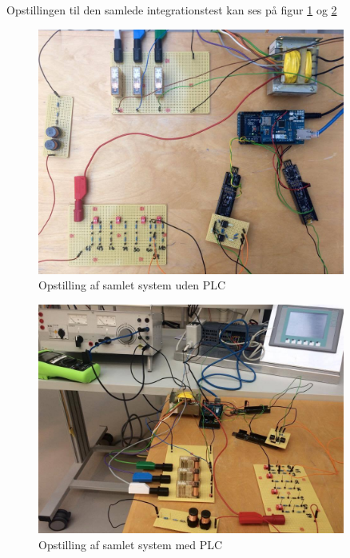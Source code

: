 Opstillingen til den samlede integrationstest kan ses på figur \ref{fig:Opstilling1} og \ref{fig:Opstilling2}

\begin{figure}[H] 
	\centering
	\includegraphics[width=0.9\textwidth]{Figure/Opstillingudenplc}
	\caption{Opstilling af samlet system uden PLC}
	\label{fig:Opstilling1}
\end{figure}

\begin{figure}[H] 
	\centering
	\includegraphics[width=0.9\textwidth]{Figure/Opstillingmedplc}
	\caption{Opstilling af samlet system med PLC}
	\label{fig:Opstilling2}
\end{figure}